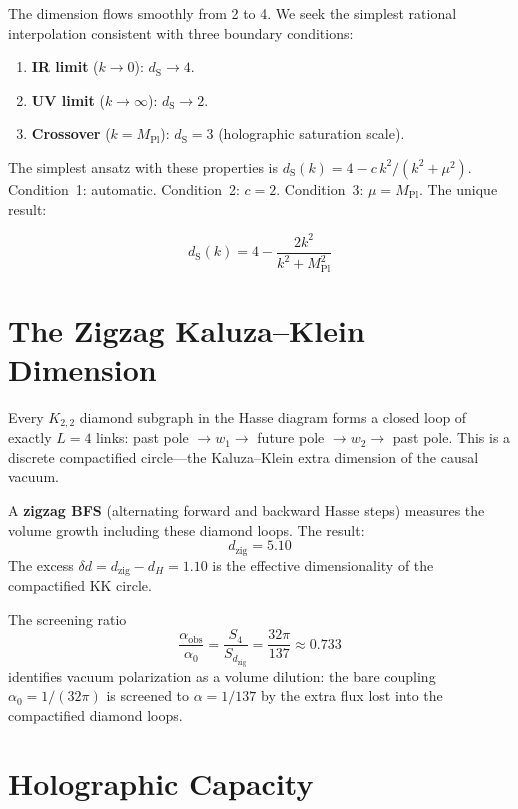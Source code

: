 \documentclass[11pt, a4paper, openany]{book}
\newcommand{\dS}{d_{\mathrm{S}}}
\newcommand{\MPl}{M_{\mathrm{Pl}}}
\begin{document}
The dimension flows smoothly from 2 to 4. We seek the simplest rational
interpolation consistent with three boundary conditions:

\begin{enumerate}
  \item \textbf{IR limit} ($k \to 0$): $\dS \to 4$.
  \item \textbf{UV limit} ($k \to \infty$): $\dS \to 2$.
  \item \textbf{Crossover} ($k = \MPl$): $\dS = 3$ (holographic
    saturation scale).
\end{enumerate}

The simplest ansatz with these properties is
$\dS(k) = 4 - c\,k^2/(k^2 + \mu^2)$. Condition~1: automatic.
Condition~2: $c = 2$. Condition~3: $\mu = \MPl$. The unique result:

\begin{equation}\label{eq:spectral-flow}
  \boxed{\dS(k) = 4 - \frac{2k^2}{k^2 + \MPl^2}}
\end{equation}

\section{The Zigzag Kaluza--Klein Dimension}\label{sec:zigzag-vol1}

Every $K_{2,2}$ diamond subgraph in the Hasse diagram forms a closed
loop of exactly $L = 4$ links: past pole $\to w_1 \to$ future pole
$\to w_2 \to$ past pole.  This is a discrete compactified circle---the
Kaluza--Klein extra dimension of the causal vacuum.

A \textbf{zigzag BFS} (alternating forward and backward Hasse steps)
measures the volume growth including these diamond loops.
The result:
\begin{equation}\label{eq:d-zig-vol1}
  d_{\mathrm{zig}} = 5.10
\end{equation}
The excess $\delta d = d_{\mathrm{zig}} - d_H = 1.10$ is the
effective dimensionality of the compactified KK circle.

The screening ratio
\[
  \frac{\alpha_{\text{obs}}}{\alpha_0}
  = \frac{S_4}{S_{d_{\mathrm{zig}}}}
  = \frac{32\pi}{137}
  \approx 0.733
\]
identifies vacuum polarization as a volume dilution: the bare coupling
$\alpha_0 = 1/(32\pi)$ is screened to $\alpha = 1/137$ by the extra
flux lost into the compactified diamond loops.

\section{Holographic Capacity}
\end{document}

